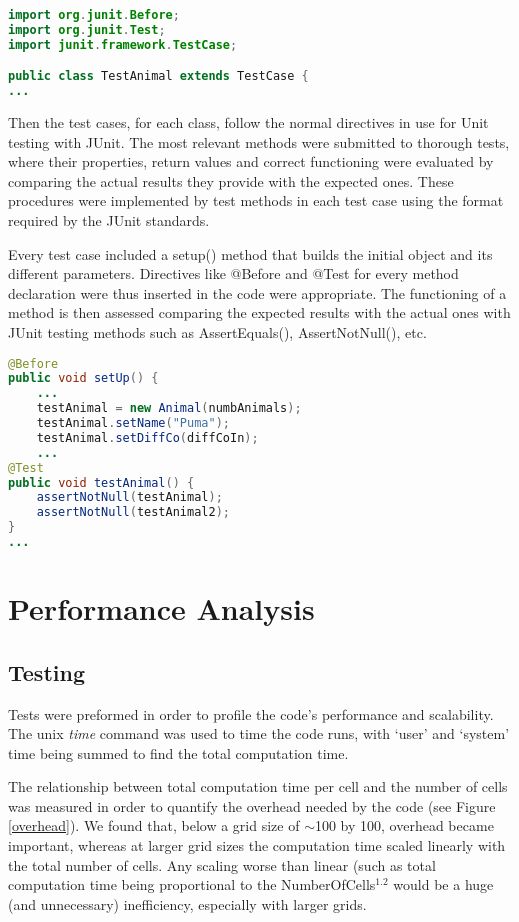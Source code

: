 \documentclass[11pt]{report}
\begin{document}
\begin{lstlisting}[language=Java,caption= Test case headers]
import org.junit.Before;
import org.junit.Test;
import junit.framework.TestCase;

public class TestAnimal extends TestCase {
...
\end{lstlisting}

Then the test cases, for each class, follow the normal directives in use for Unit testing with JUnit. The most relevant methods were submitted to thorough tests, where their properties, return values and correct functioning were evaluated by comparing the actual results they provide with the expected ones. These procedures were implemented by test methods in each test case using the format required by the JUnit standards. 

Every test case included a setup() method that builds the initial object and its different parameters. Directives like @Before and @Test for every method declaration were thus inserted in the code were appropriate. The functioning of a method is then assessed comparing the expected results with the actual ones with JUnit testing methods such as AssertEquals(), AssertNotNull(), etc.

\begin{lstlisting}[language=Java,caption= Use of JUnit directives in test cases]
@Before
public void setUp() {
    ...
    testAnimal = new Animal(numbAnimals);
    testAnimal.setName("Puma");
    testAnimal.setDiffCo(diffCoIn);
    ...
@Test
public void testAnimal() {
    assertNotNull(testAnimal);
    assertNotNull(testAnimal2);
} 
...
\end{lstlisting}

\chapter{Performance Analysis}
   \section{Testing} %
   
   Tests were preformed in order to profile the code's performance and scalability. The unix \emph{time} command was 
   used to time the code runs, with `user' and `system' time being summed to find the total computation time.\newline{}
   
   The relationship between total computation time per cell and the number of cells was measured in order to quantify the overhead
   needed by the code (see Figure \ref{overhead}). We found that, below a grid size of $\sim$100 by 100, overhead became important, whereas at 
   larger grid sizes the computation time scaled linearly with the total number of cells. Any scaling worse than linear (such as 
   total computation time being proportional to the NumberOfCells$^{1.2}$ would be a huge (and unnecessary) inefficiency, especially with larger grids.\newline{}
   
\end{document}
